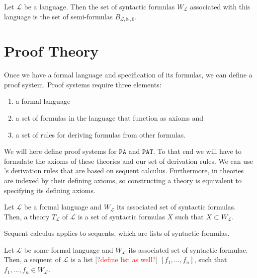 \begin{definition}\label{def:syn-f}
    \leanok
    Let $\mathcal{L}$ be a language. Then the set of syntactic formulas $W_{\mathcal{L}}$ associated with this language is the set of semi-formulas $B_{\mathcal{L},\mathbb{N},0}$.
\end{definition}

\section{Proof Theory}
Once we have a formal language and specification of its formulas, we can define a proof system. Proof systems require three elements:
\begin{enumerate}
    \item a formal language
    \item a set of formulas in the language that function as axioms and
    \item a set of rules for deriving formulas from other formulas.
\end{enumerate}    
We will here define proof systems for $\texttt{PA}$ and $\texttt{PAT}$. To that end we will have to formulate the axioms of these theories and our set of derivation rules. We can use \cite{ffl}'s derivation rules that are based on sequent calculus. Furthermore, in \cite{ffl} theories are indexed by their defining axioms, so constructing a theory is equivalent to specifying its defining axioms.

\begin{definition}[theory]\label{def:theory}
    \leanok
    Let $\mathcal{L}$ be a formal language and $W_{\mathcal{L}}$ its associated set of syntactic formulas. Then, a theory $T_{\mathcal{L}}$ of $\mathcal{L}$ is a set of syntactic formulas $X$ such that $X \subset W_{\mathcal{L}}$.
\end{definition}

Sequent calculus applies to sequents, which are lists of syntactic formulas.

\begin{definition}[sequent]\label{def:seq}
    \leanok
    Let $\mathcal{L}$ be some formal language and $W_{\mathcal{L}}$ its associated set of syntactic formulae. Then, a sequent of $\mathcal{L}$ is a list [\textcolor{red}{?define list as well?}] $[f_1,...,f_n]$, such that $f_1,...,f_n \in W_{\mathcal{L}}$.
\end{definition}

